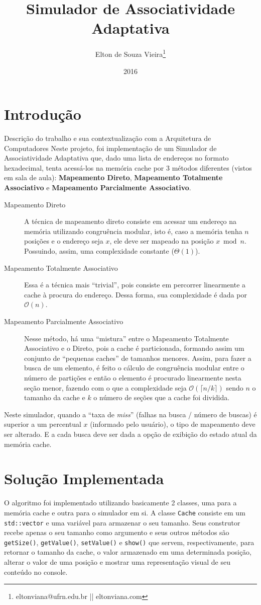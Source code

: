 \documentclass[12pt,openright,oneside,a4paper,english,brazil]{abntex2}
\author{Elton de Souza Vieira\thanks{eltonviana@ufrn.edu.br || eltonviana.com}}
\title{Simulador de Associatividade Adaptativa}
\date{2016}
\newcommand{\code}[1]{\colorbox{codegray}{\texttt{#1}}}
\begin{document}
\imprimircapa

\tableofcontents

\chapter{Introdução}
Descrição do trabalho e sua contextualização com a Arquitetura de Computadores
Neste projeto, foi implementação de um Simulador de Associatividade Adaptativa que, dado uma lista de endereços no formato hexadecimal, tenta acessá-los na memória cache por 3 métodos diferentes (vistos em sala de aula): \textbf{Mapeamento Direto}, \textbf{Mapeamento Totalmente Associativo} e \textbf{Mapeamento Parcialmente Associativo}.

\begin{description}
\item[Mapeamento Direto]
A técnica de mapeamento direto consiste em acessar um endereço na memória utilizando congruência modular, isto é, caso a memória tenha $ n $ posições e o endereço seja $ x $, ele deve ser mapeado na posição $ x \bmod n $. Possuindo, assim, uma complexidade constante ($ \Theta (1) $).
\item[Mapeamento Totalmente Associativo]
Essa é a técnica mais ``trivial'', pois consiste em percorrer linearmente a cache à procura do endereço. Dessa forma, sua complexidade é dada por $ \mathcal{O} (n) $.
\item[Mapeamento Parcialmente Associativo]
Nesse método, há uma ``mistura'' entre o Mapeamento Totalmente Associativo e o Direto, pois a cache é particionada, formando assim um conjunto de ``pequenas caches'' de tamanhos menores. Assim, para fazer a busca de um elemento, é feito o cálculo de congruência modular entre o número de partições e então o elemento é procurado linearmente nesta seção menor, fazendo com o que a complexidade seja $ \mathcal{O} (\lceil n/k \rceil) $ sendo $ n $ o tamanho da cache e $ k $ o número de seções que a cache foi dividida.
\end{description}

Neste simulador, quando a ``taxa de \textit{miss}'' (falhas na busca / número de buscas) é superior a um percentual $ x $ (informado pelo usuário), o tipo de mapeamento deve ser alterado. E a cada busca deve ser dada a opção de exibição do estado atual da memória cache.

\chapter{Solução Implementada}
O algoritmo foi implementado utilizando basicamente 2 classes, uma para a memória cache e outra para o simulador em si.
A classe \code{Cache} consiste em um \code{std::vector} e uma variável para armazenar o seu tamanho. Seus construtor recebe apenas o seu tamanho como argumento e seus outros métodos são \code{getSize()}, \code{getValue()}, \code{setValue()} e \code{show()} que servem, respectivamente, para retornar o tamanho da cache, o valor armazenado em uma determinada posição, alterar o valor de uma posição e mostrar uma representação visual de seu conteúdo no console.
\end{document}
